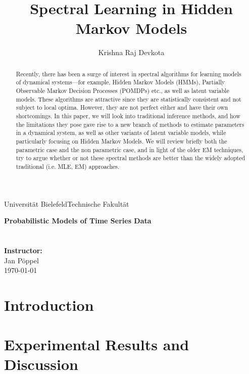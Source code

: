 \documentclass[a4paper]{article}
\title{Spectral Learning in Hidden Markov Models}
\author{Krishna Raj Devkota}
\begin{document}
\pagestyle{empty}
\begin{titlepage}
\makeatletter
	Universität Bielefeld\hfill Technische Fakultät\\[2cm]
	\begin{center}
		\textbf{\Large Probabilistic Models of Time Series Data}\\[1.5cm]
		\textbf{\huge \@title }\\[1.5cm]
		\Large \@author \\[2cm]
		\Large \textbf{Instructor:}\\
		\Large Jan Pöppel\\[2cm]
		\Large\today
	\end{center}
\makeatother
\end{titlepage}

\newpage

\begin{abstract}

Recently, there has been a surge of interest in
spectral algorithms for learning models of dynamical
systems—for example, Hidden Markov Models
(HMMs), Partially Observable Markov Decision Processes
(POMDPs) etc., as well as latent variable models. These algorithms are attractive
since they are statistically consistent and not subject
to local optima. However, they are not perfect either and have their own shortcomings.
\newline
\newline
In this paper, we will look into traditional inference methods, and how the limitations they pose gave rise to a new branch of methods to estimate parameters in a dynamical system, as well as other variants of latent variable models, while particularly focusing on Hidden Markov Models. 
\newline
\newline
We will review briefly both the parametric case and the non parametric case, and in light of the older EM techniques, try to argue whether or not these spectral methods are better than the widely adopted traditional (i.e. MLE, EM) approaches.

\end{abstract}

\newpage

{\hypersetup{linkcolor=black}
\tableofcontents}

\newpage


\section{Introduction}



\section{Experimental Results and Discussion}


\newpage 

%



\end{document}
